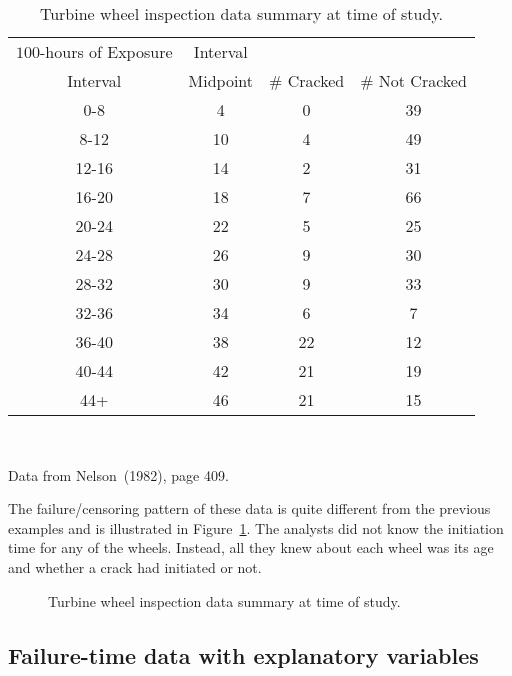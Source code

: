 \begin{example}
\begin{table}
\caption{Turbine wheel inspection data summary at time of study.}
\centering\small
\begin{tabular}{cccc}
\\[-.5ex]
\hline
$100$-hours of Exposure & Interval \\ 
Interval & Midpoint & \# Cracked & \# Not Cracked  \\
\hline
0-8 & 4 & 0 & 39 \\ 8-12 & 10 & 4 & 49 \\ 12-16 & 14 & 2 & 31 \\ 
16-20 & 18 & 7 & 66 \\ 20-24 & 22 & 5 & 25 \\ 24-28 & 26 &
9 & 30 \\ 28-32 & 30 & 9 & 33 \\ 32-36 & 34 & 6 & 7 \\ 
36-40 & 38 & 22 & 12 \\ 40-44 & 42 & 21 & 19 \\ 44+ & 46 & 21
& 15\\
\hline
\end{tabular}\\
\begin{minipage}[t]{4in}
Data from Nelson~(1982), page 409.
\end{minipage}
\label{table:turbine.data}
\end{table}
The failure/censoring pattern of these data is quite different from
the previous examples and is illustrated in
Figure~\ref{figure:turbine.datafig.ps}. The analysts did not know the
initiation time for any of the wheels. Instead, all they knew about
each wheel was its age and whether a crack had initiated or not.
\begin{figure}
\caption{Turbine wheel inspection data summary at time of study.}
\label{figure:turbine.datafig.ps}
\end{figure}
\end{example}







\subsection{Failure-time data with explanatory variables}
\label{section:ttf.with.exp}

